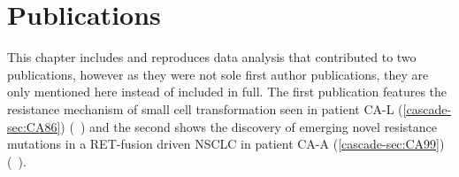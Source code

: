 \section{Publications}
\label{cascade-sec:publication}

This chapter includes and reproduces data analysis that contributed to two publications, however as they were not sole first author publications, they are only mentioned here instead of included in full. 
The first publication features the resistance mechanism of small cell transformation seen in patient CA-L (\autoref{cascade-sec:CA86}) (\textit{}~\textcite{Burr2019}) and the second shows the discovery of emerging novel resistance mutations in a RET-fusion driven NSCLC in patient CA-A (\autoref{cascade-sec:CA99}) (\textit{}~\textcite{Solomon2020}).
